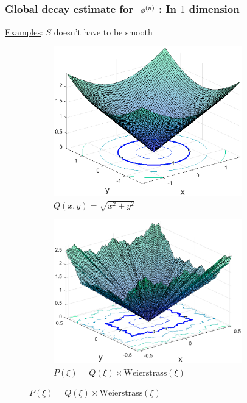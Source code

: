 \documentclass{beamer}
\theoremstyle{definition}
\begin{document}
\begin{frame}
\frametitle{Global decay estimate for $\abs{\phi^{(n)}}$: In $1$ dimension}

\underline{Examples}: $S$ doesn't have to be smooth
\begin{figure}
	\centering
	\begin{subfigure}{0.49\textwidth}
		\centering
		\includegraphics[width=0.9\textwidth]{Fig2c.eps}
		\caption{$Q(x,y) = \sqrt{x^2+y^2}$}
	\end{subfigure}
	\hspace{-30pt}
	\begin{subfigure}{0.49\textwidth}
		\centering
		\includegraphics[width=0.9\textwidth]{Fig2a.eps}
		\caption{$P(\xi) = Q(\xi) \times \text{Weierstrass}(\xi)$}
	\end{subfigure}
\end{figure}
\end{frame}
\end{document}
